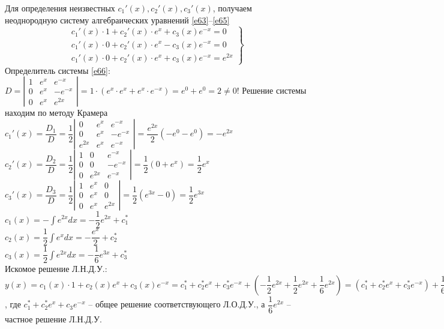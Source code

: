 \documentclass{article}
\numberwithin{equation}{section}
\begin{document}
Для определения неизвестных $c_1'(x),c_2'(x),c_3'(x)$, получаем неоднородную систему алгебраических уравнений \eqref{e63}--\eqref{e65}
\begin{equation}\label{e66}
\left.
\begin{matrix}
c_1'(x)\cdot1+c_2'(x)\cdot e^x+c_3(x)e^{-x}=0\\
c_1'(x)\cdot0+c_2'(x)\cdot e^x-c_3(x)e^{-x}=0\\
c_1'(x)\cdot0+c_2'(x)\cdot e^x+c_3(x)e^{-x}=e^{2x}
\end{matrix}
\right\}
\end{equation}
Определитель системы \eqref{e66}:
$D=\left|
\begin{matrix}
1 & e^x & e^{-x}\\
0 & e^x & -e^{-x}\\
0 & e^x & e^{2x}
\end{matrix}
\right|=1\cdot(e^x\cdot e^x+e^x\cdot e^{-x})=e^0+e^0=2\neq0!$
Решение системы находим по методу Крамера\\
$c_1'(x)=\dfrac{D_1}{D}=\dfrac{1}{2}\left|
\begin{matrix}
0 & e^x & e^{-x}\\
0 & e^x & -e^{-x}\\
e^{2x} & e^x & e^{-x}
\end{matrix}
\right|=\dfrac{e^{2x}}{2}(-e^0-e^0)=-e^{2x}$\\
$c_2'(x)=\dfrac{D_2}{D}=\dfrac{1}{2}\left|
\begin{matrix}
1 & 0 & e^{-x}\\
0 & 0 & -e^{-x}\\
0 & e^{2x} & e^{-x}
\end{matrix}
\right|=\dfrac{1}{2}(0+e^x)=\dfrac{1}{2}e^x$\\
$c_3'(x)=\dfrac{D_3}{D}=\dfrac{1}{2}\left|
\begin{matrix}
1 & e^x & 0\\
0 & e^x & 0\\
0 & e^x & e^{2x}
\end{matrix}
\right|=\dfrac{1}{2}(e^{3x}-0)=\dfrac{1}{2}e^{3x}$\\
$c_1(x)=-\int e^{2x}dx=-\dfrac{1}{2}e^{2x}+c_1^*$\\
$c_2(x)=\dfrac{1}{2}\int e^xdx=-\dfrac{e^x}{2}+c_2^*$\\
$c_3(x)=\dfrac{1}{2}\int e^{2x}dx=-\dfrac{1}{6}e^{3x}+c_3^*$\\
Искомое решение Л.Н.Д.У.: $y(x)=c_1(x)\cdot1+c_2(x)e^x+c_3(x)e^{-x}=c_1^*+c_2^*e^x+c_3^*e^{-x}+(-\dfrac{1}{2}e^{2x}+\dfrac{1}{2}e^{2x}+\dfrac{1}{6}e^{2x})=(c_1^*+c_2^*e^x+c_3^*e^{-x})+\dfrac{1}{6}e^{2x}$, где $c_1^*+c_2^*e^x+c_3e^{-x}$ -- общее решение соответствующего Л.О.Д.У., а $\dfrac{1}{6}e^{2x}$ -- частное решение Л.Н.Д.У.
\end{document}
